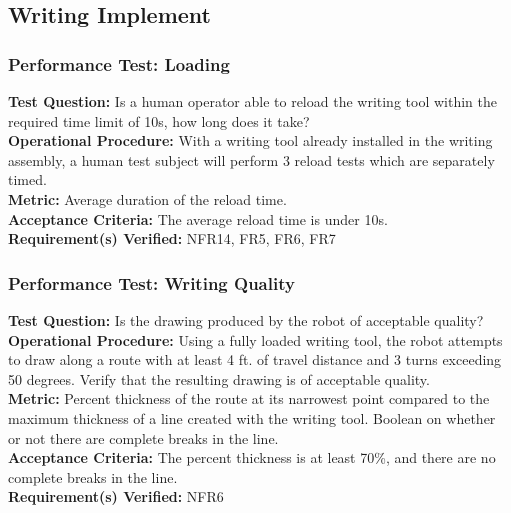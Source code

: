 
\subsection{Writing Implement}
\label{sec:verification_writing_implement}

\subsubsection{Performance Test: Loading}
\label{test:writing_pt_load}
\textbf{Test Question:} Is a human operator able to reload the writing tool within the required time limit of 10s, how long does it take? \\
\textbf{Operational Procedure:} With a writing tool already installed in the writing assembly, a human test subject will perform 3 reload tests which are separately timed. \\
\textbf{Metric:} Average duration of the reload time. \\
\textbf{Acceptance Criteria:} The average reload time is under 10s. \\
\textbf{Requirement(s) Verified:} NFR14, FR5, FR6, FR7 \\

\subsubsection{Performance Test: Writing Quality}
\label{test:writing_pt_qual}
\textbf{Test Question:} Is the drawing produced by the robot of acceptable quality? \\
\textbf{Operational Procedure:} Using a fully loaded writing tool, the robot attempts to draw along a route with at least 4 ft. of travel distance and 3 turns exceeding 50 degrees. Verify that the resulting drawing is of acceptable quality. \\
\textbf{Metric:} Percent thickness of the route at its narrowest point compared to the maximum thickness of a line created with the writing tool. Boolean on whether or not there are complete breaks in the line. \\
\textbf{Acceptance Criteria:} The percent thickness is at least 70\%, and there are no complete breaks in the line. \\
\textbf{Requirement(s) Verified:} NFR6 \\

